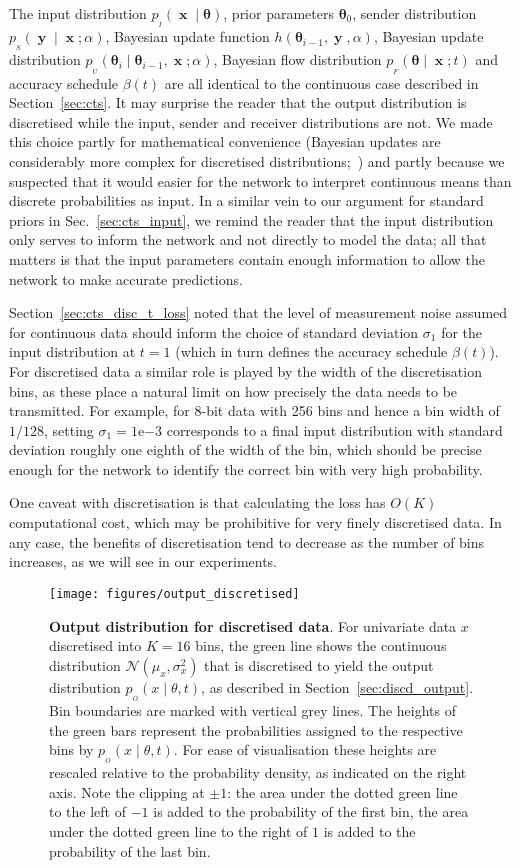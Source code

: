 \documentclass[11pt,table]{article}
\DeclareMathOperator{\x}{\mathbf{x}}
\DeclareMathOperator{\y}{\mathbf{y}}
\newcommand{\N}[2]{\mathcal{N}\left(#1 , #2\right)}
\newcommand{\tidx}[2]{#1_{#2}}
\renewcommand{\vec}[1]{\boldsymbol{#1}}
\newcommand{\pars}{\theta}
\newcommand{\parsn}{\vec{\pars}}
\newcommand{\parsnt}[1]{\tidx{\parsn}{#1}}
\newcommand{\0}[1]{\constvec{0}{#1}}
\newcommand{\1}[1]{\constvec{1}{#1}}
\newcommand{\sender}[2]{p_{_S}\left(#1 \mid #2\right)}
\newcommand{\out}{p_{_O}}
\newcommand{\inp}{p_{_I}}
\newcommand{\flow}{p_{_F}}
\newcommand{\update}{p_{_U}}
\begin{document}
The input distribution $\inp(\x \mid \parsn)$, prior parameters $\parsnt{0}$, sender distribution $\sender{\y}{\x ; \alpha}$, Bayesian update function $h(\parsnt{i-1}, \y, \alpha)$, Bayesian update distribution $\update(\parsnt{i} \mid \parsnt{i-1}, \x ; \alpha)$, Bayesian flow distribution $\flow(\parsn \mid \x; t)$ and accuracy schedule $\beta(t)$ are all identical to the continuous case described in Section~\ref{sec:cts}. 
It may surprise the reader that the output distribution is discretised while the input, sender and receiver distributions are not.
We made this choice partly for mathematical convenience (Bayesian updates are considerably more complex for discretised distributions;~\citep{austin2021d3pm}) and partly because we suspected that it would easier for the network to interpret continuous means than discrete probabilities as input.
In a similar vein to our argument for standard priors in Sec.~\ref{sec:cts_input}, we remind the reader that the input distribution only serves to inform the network and not directly to model the data; all that matters is that the input parameters contain enough information to allow the network to make accurate predictions.

Section~\ref{sec:cts_disc_t_loss} noted that the level of measurement noise assumed for continuous data should inform the choice of standard deviation $\sigma_1$ for the input distribution at $t=1$ (which in turn defines the accuracy schedule $\beta(t)$).
For discretised data a similar role is played by the width of the discretisation bins, as these place a natural limit on how precisely the data needs to be transmitted.
For example, for $8$-bit data with 256 bins and hence a bin width of $1/128$, setting $\sigma_1 = 1\mathrm{e}{-3}$ corresponds to a final input distribution with standard deviation roughly one eighth of the width of the bin, which should be precise enough for the network to identify the correct bin with very high probability.

One caveat with discretisation is that calculating the loss has $O(K)$ computational cost, which may be prohibitive for very finely discretised data. 
In any case, the benefits of discretisation tend to decrease as the number of bins increases, as we will see in our experiments.
\begin{figure}[t!] 
\texttt{[image: figures/output\_discretised]}
\caption{\textbf{Output distribution for discretised data}. For univariate data $x$ discretised into $K=16$ bins, the green line shows the continuous distribution $\N{\mu_x}{\sigma^2_x}$ that is discretised to yield the output distribution $\out(x\mid \theta, t)$, as described in Section~\ref{sec:discd_output}. Bin boundaries are marked with vertical grey lines. The heights of the green bars represent the probabilities assigned to the respective bins by $\out(x\mid \theta, t)$. For ease of visualisation these heights are rescaled relative to the probability density, as indicated on the right axis. Note the clipping at $\pm 1$: the area under the dotted green line to the left of $-1$ is added to the probability of the first bin, the area under the dotted green line to the right of $1$ is added to the probability of the last bin.}
\label{fig:discd_p}
\end{figure}
\end{document}

